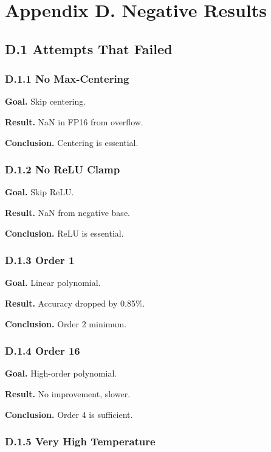 \section{Appendix D. Negative Results}

\subsection{D.1 Attempts That Failed}

\subsubsection{D.1.1 No Max-Centering}

\textbf{Goal.} Skip centering.

\textbf{Result.} NaN in FP16 from overflow.

\textbf{Conclusion.} Centering is essential.

\subsubsection{D.1.2 No ReLU Clamp}

\textbf{Goal.} Skip ReLU.

\textbf{Result.} NaN from negative base.

\textbf{Conclusion.} ReLU is essential.

\subsubsection{D.1.3 Order 1}

\textbf{Goal.} Linear polynomial.

\textbf{Result.} Accuracy dropped by 0.85\%.

\textbf{Conclusion.} Order 2 minimum.

\subsubsection{D.1.4 Order 16}

\textbf{Goal.} High-order polynomial.

\textbf{Result.} No improvement, slower.

\textbf{Conclusion.} Order 4 is sufficient.

\subsubsection{D.1.5 Very High Temperature}

